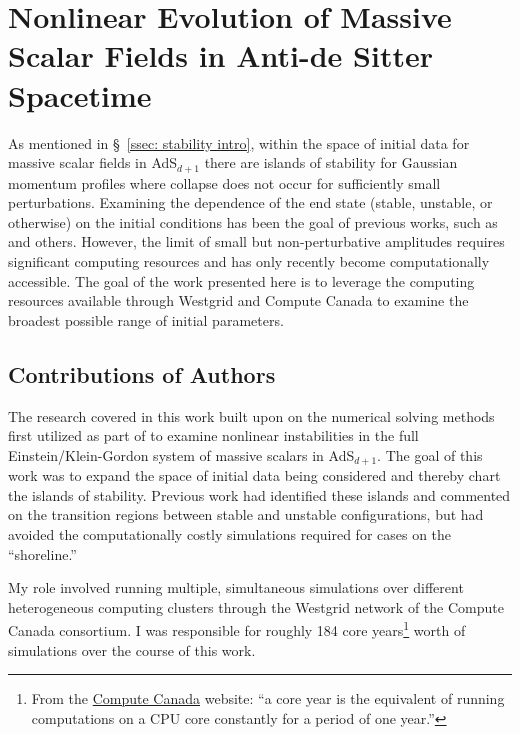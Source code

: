 \documentclass[../PhD.tex]{subfiles}
\begin{document}

\chapter{Nonlinear Evolution of Massive Scalar Fields in Anti-de Sitter Spacetime}
\label{ch: massive}

As mentioned in \S~\!\ref{ssec: stability intro}, within the space of initial data for massive scalar fields in AdS$_{d+1}$ there are islands of stability for Gaussian momentum profiles where collapse does not occur for sufficiently small perturbations. Examining the dependence of the end state (stable, unstable, or otherwise) on the initial conditions has been the goal of previous works, such as \cite{1508.02709, 1410.1869} and others. However, the limit of small but non-perturbative amplitudes requires significant computing resources and has only recently become computationally accessible. The goal of the work presented here is to leverage the computing resources available through Westgrid and Compute Canada to examine the broadest possible range of initial parameters.

\section{Contributions of Authors}

The research covered in this work built upon on the numerical solving methods first utilized as part of\cite{1508.02709, 1410.1869} to examine nonlinear instabilities in the full Einstein/Klein-Gordon system of massive scalars in AdS$_{d+1}$. The goal of this work was to expand the space of initial data being considered and thereby chart the islands of stability. Previous work had identified these islands and commented on the transition regions between stable and unstable configurations, but had avoided the computationally costly simulations required for cases on the ``shoreline.'' 

My role involved running multiple, simultaneous simulations over different heterogeneous computing clusters through the Westgrid network of the Compute Canada consortium. I was responsible for roughly 184 core years\footnote{From the \href{https://www.computecanada.ca/}{Compute Canada} website: ``a core year is the equivalent of running computations on a CPU core constantly for a period of one year.''} worth of simulations over the course of this work.
\end{document}
